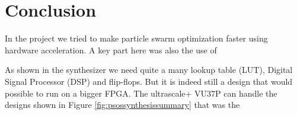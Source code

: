 \section{Conclusion}
In the project we tried to make particle swarm optimization faster using hardware acceleration. A key part here was also the use of 


As shown in the synthesizer we need quite a many lookup table (LUT), Digital Signal Processor (DSP) and flip-flops. But it is indeed still a design that would possible to run on a bigger FPGA. The ultrascale+ VU37P can handle the designs shown in Figure \ref{fig:psossynthesissummary} that was the
